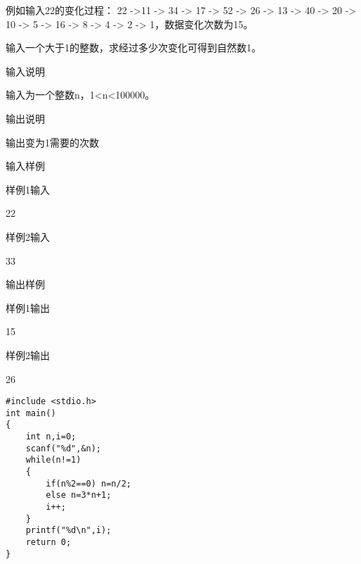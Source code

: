 例如输入22的变化过程： 22 ->11 -> 34 -> 17 -> 52 -> 26 -> 13 -> 40 -> 20 -> 10 -> 5 -> 16 -> 8 -> 4 -> 2 -> 1，数据变化次数为15。

输入一个大于1的整数，求经过多少次变化可得到自然数1。

输入说明	

输入为一个整数n，1<n<100000。

输出说明	

输出变为1需要的次数

输入样例
	
样例1输入

22

样例2输入

33

输出样例

样例1输出
	
15

样例2输出

26

\begin{lstlisting}
#include <stdio.h>
int main()
{
	int n,i=0;
	scanf("%d",&n);
	while(n!=1)
	{
		if(n%2==0) n=n/2;
		else n=3*n+1;
		i++;
	} 
	printf("%d\n",i);
	return 0;	
}
\end{lstlisting}
